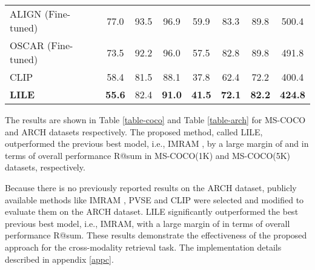 \documentclass{midl}
\begin{document}
\begin{table}[!h]
{\begin{tabular}{@{}lccccccc@{}}
\midrule
ALIGN (Fine-tuned) \cite{jia2021scaling} &77.0 & 93.5 & 96.9 & 59.9 & 83.3 & 89.8 & 500.4 \\
OSCAR (Fine-tuned)\cite{li2020oscar}   & 73.5 & 92.2 & 96.0 & 57.5 & 82.8 & 89.8 & 491.8 \\
CLIP\cite{radford2021learning}         & 58.4 & 81.5 & 88.1 & 37.8 & 62.4 & 72.2 & 400.4 \\ \midrule
\textbf{LILE}                                                    & \textbf{55.6}     &    82.4  & \textbf{91.0}     & \textbf{41.5}     & \textbf{72.1}     &    \textbf{82.2}  &     \textbf{424.8}  \\ \bottomrule
\end{tabular}}
\end{table}


\begin{table*}[ht!]
\centering
\caption{Comparison with previous methods using the ARCH dataset}
\label{table-arch}
\end{table*}
The results are shown in Table \ref{table-coco} and Table \ref{table-arch} for MS-COCO and ARCH datasets respectively. The proposed method, called LILE, outperformed the previous best model, i.e., IMRAM \cite{chen2020imram}, by a large margin of  and  in terms of overall performance R@sum in MS-COCO(1K) and MS-COCO(5K) datasets,  respectively. 

Because there is no previously reported results on the ARCH dataset, publicly available methods like IMRAM \cite{chen2020imram}, PVSE \cite{song2019polysemous} and CLIP \cite{radford2021learning} were selected and modified to evaluate them on the ARCH dataset. LILE significantly outperformed the best previous best model, i.e., IMRAM, with a large margin of  in terms of overall performance R@sum. These results demonstrate the effectiveness of the proposed approach for the cross-modality retrieval task. The implementation details described in appendix \ref{appc}.
\end{document}
